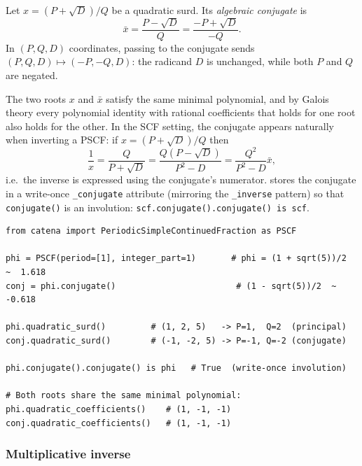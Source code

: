 \begin{definition}
  \label{def:conjugate}
  Let $x = (P + \sqrt{D})/Q$ be a quadratic surd.  Its \emph{algebraic conjugate} is
  \[
    \bar{x} = \frac{P - \sqrt{D}}{Q} = \frac{-P + \sqrt{D}}{-Q}.
  \]
  In $(P, Q, D)$ coordinates, passing to the conjugate sends $(P, Q, D) \mapsto (-P, -Q, D)$:
  the radicand $D$ is unchanged, while both $P$ and $Q$ are negated.
\end{definition}

\begin{remark}
  The two roots $x$ and $\bar{x}$ satisfy the same minimal polynomial, and by Galois theory every
  polynomial identity with rational coefficients that holds for one root
  also holds for the other. In the SCF setting, the conjugate appears naturally when inverting a PSCF: if $x = (P +
  \sqrt{D})/Q$ then
  \[
    \frac{1}{x} = \frac{Q}{P + \sqrt{D}} = \frac{Q(P - \sqrt{D})}{P^2 - D}
    = \frac{Q^2}{P^2 - D} \bar{x},
  \]
  i.e.\ the inverse is expressed using the conjugate's numerator.  \catena stores the conjugate
  in a write-once \texttt{\_conjugate} attribute (mirroring the \texttt{\_inverse} pattern) so
  that \texttt{conjugate()} is an involution: \texttt{scf.conjugate().conjugate() is scf}.
\end{remark}

\begin{catenadef}
\begin{lstlisting}[style=python]
from catena import PeriodicSimpleContinuedFraction as PSCF

phi = PSCF(period=[1], integer_part=1)       # phi = (1 + sqrt(5))/2  ~  1.618
conj = phi.conjugate()                        # (1 - sqrt(5))/2  ~  -0.618

phi.quadratic_surd()         # (1, 2, 5)   -> P=1,  Q=2  (principal)
conj.quadratic_surd()        # (-1, -2, 5) -> P=-1, Q=-2 (conjugate)

phi.conjugate().conjugate() is phi   # True  (write-once involution)

# Both roots share the same minimal polynomial:
phi.quadratic_coefficients()    # (1, -1, -1)
conj.quadratic_coefficients()   # (1, -1, -1)
\end{lstlisting}
\end{catenadef}

\subsubsection{Multiplicative inverse}

